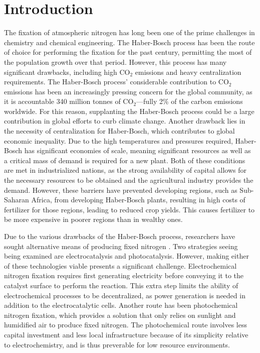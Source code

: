 \documentclass[catalysts,article,submit,moreauthors,pdftex,10pt,a4paper]{mdpi}
\theoremstyle{mdpi}
\newcounter{ex}
\newcounter{re}
\theoremstyle{mdpidefinition}
\begin{document}
\section{Introduction}
The fixation of atmospheric nitrogen has long been one of the prime challenges in chemistry and chemical engineering.\cite{ritter_18, Schloegl_2003} The Haber-Bosch process has been the route of choice for performing the fixation for the past century, permitting the most of the population growth over that period.\cite{Smil_1999} However, this process has many significant drawbacks, including high CO$_2$ emissions and heavy centralization requirements.\cite{Comer_2019} The Haber-Bosch process' considerable contribution to CO$_2$ emissions has been an increasingly pressing concern for the global community, as it is accountable 340 million tonnes of CO$_2$---fully 2\% of the carbon emissions worldwide.\cite{gross_12, Schiffer_2017} For this reason, supplanting the Haber-Bosch process could be a large contribution in global efforts to curb climate change. Another drawback lies in the necessity of centralization for Haber-Bosch, which contributes to global economic inequality.\cite{Comer_2019} Due to the high temperatures and pressures required, Haber-Bosch has significant economies of scale, meaning significant resources as well as a critical mass of demand is required for a new plant. Both of these conditions are met in industrialized nations, as the strong availability of capital allows for the necessary resources to be obtained and the agricultural industry provides the demand.\cite{McArthur_2017} However, these barriers have prevented developing regions, such as Sub-Saharan Africa, from developing Haber-Bosch plants, resulting in high costs of fertilizer for those regions, leading to reduced crop yields.\cite{yuan_2014, IFDC_2012} This causes fertilizer to be more expensive in poorer regions than in wealthy ones.

Due to the various drawbacks of the Haber-Bosch process, researchers have sought alternative means of producing fixed nitrogen \cite{Comer_2019, McPherson_2019,WANG20181055, Kyriakou_2017}. Two strategies seeing being examined are electrocatalysis\cite{McPherson_2019} and photocatalysis\cite{Medford_2017}. However, making either of these technologies viable presents a significant challenge. Electrochemical nitrogen fixation requires first generating electricity before conveying it to the catalyst surface to perform the reaction.\cite{kyriakou_2017} This extra step limits the ability of electrochemical processes to be decentralized, as power generation is needed in addition to the electrocatalytic cells. Another route has been photochemical nitrogen fixation, which provides a solution that only relies on sunlight and humidified air to produce fixed nitrogen. The photochemical route involves less capital investment and less local infrastructure because of its simplicity relative to electrochemistry, and is thus preverable for low resource environments.
\end{document}
